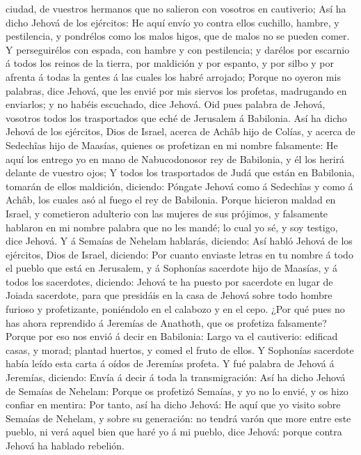 ciudad, de vuestros hermanos que no salieron con vosotros en cautiverio;
 Así ha dicho Jehová de los ejércitos: He aquí envío yo
contra ellos cuchillo, hambre, y pestilencia, y pondrélos como los malos
higos, que de malos no se pueden comer.  Y perseguirélos
con espada, con hambre y con pestilencia; y darélos por escarnio á todos
los reinos de la tierra, por maldición y por espanto, y por silbo y por
afrenta á todas la gentes á las cuales los habré arrojado; 
Porque no oyeron mis palabras, dice Jehová, que les envié por mis
siervos los profetas, madrugando en enviarlos; y no habéis escuchado,
dice Jehová.  Oid pues palabra de Jehová, vosotros todos
los trasportados que eché de Jerusalem á Babilonia.  Así ha
dicho Jehová de los ejércitos, Dios de Israel, acerca de Achâb hijo de
Colías, y acerca de Sedechîas hijo de Maasías, quienes os profetizan en
mi nombre falsamente: He aquí los entrego yo en mano de Nabucodonosor
rey de Babilonia, y él los herirá delante de vuestro ojos; 
Y todos los trasportados de Judá que están en Babilonia, tomarán de
ellos maldición, diciendo: Póngate Jehová como á Sedechîas y como á
Achâb, los cuales asó al fuego el rey de Babilonia.  Porque
hicieron maldad en Israel, y cometieron adulterio con las mujeres de sus
prójimos, y falsamente hablaron en mi nombre palabra que no les mandé;
lo cual yo sé, y soy testigo, dice Jehová.  Y á Semaías de
Nehelam hablarás, diciendo:  Así habló Jehová de los
ejércitos, Dios de Israel, diciendo: Por cuanto enviaste letras en tu
nombre á todo el pueblo que está en Jerusalem, y á Sophonías sacerdote
hijo de Maasías, y á todos los sacerdotes, diciendo: 
Jehová te ha puesto por sacerdote en lugar de Joiada sacerdote, para que
presidáis en la casa de Jehová sobre todo hombre furioso y profetizante,
poniéndolo en el calabozo y en el cepo.  ¿Por qué pues no
has ahora reprendido á Jeremías de Anathoth, que os profetiza
falsamente?  Porque por eso nos envió á decir en Babilonia:
Largo va el cautiverio: edificad casas, y morad; plantad huertos, y
comed el fruto de ellos.  Y Sophonías sacerdote había leído
esta carta á oídos de Jeremías profeta.  Y fué palabra de
Jehová á Jeremías, diciendo:  Envía á decir á toda la
transmigración: Así ha dicho Jehová de Semaías de Nehelam: Porque os
profetizó Semaías, y yo no lo envié, y os hizo confiar en mentira:
 Por tanto, así ha dicho Jehová: He aquí que yo visito
sobre Semaías de Nehelam, y sobre su generación: no tendrá varón que
more entre este pueblo, ni verá aquel bien que haré yo á mi pueblo, dice
Jehová: porque contra Jehová ha hablado rebelión.

